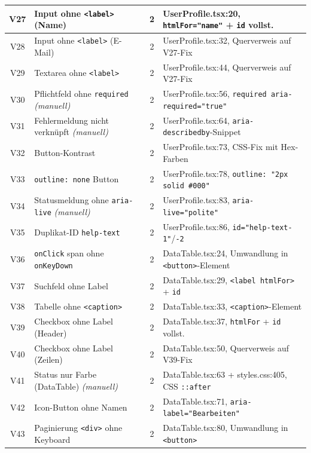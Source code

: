 \begin{longtable}{|c|p{5.2cm}|c|p{5.8cm}|}
\hline
V27 & Input ohne \texttt{<label>} (Name)           & 2 & UserProfile.tsx:20, \texttt{htmlFor="name"} + \texttt{id} vollst. \\
\hline
V28 & Input ohne \texttt{<label>} (E-Mail)         & 2 & UserProfile.tsx:32, Querverweis auf V27-Fix \\
\hline
V29 & Textarea ohne \texttt{<label>}               & 2 & UserProfile.tsx:44, Querverweis auf V27-Fix \\
\hline
V30 & Pflichtfeld ohne \texttt{required} \textit{(manuell)} & 2 & UserProfile.tsx:56, \texttt{required aria-required="true"} \\
\hline
V31 & Fehlermeldung nicht verknüpft \textit{(manuell)} & 2 & UserProfile.tsx:64, \texttt{aria-describedby}-Snippet \\
\hline
V32 & Button-Kontrast                              & 2 & UserProfile.tsx:73, \ac{CSS}-Fix mit Hex-Farben \\
\hline
V33 & \texttt{outline: none} Button                & 2 & UserProfile.tsx:78, \texttt{outline: "2px solid \#000"} \\
\hline
V34 & Statusmeldung ohne \texttt{aria-live} \textit{(manuell)} & 2 & UserProfile.tsx:83, \texttt{aria-live="polite"} \\
\hline
V35 & Duplikat-ID \texttt{help-text}               & 2 & UserProfile.tsx:86, \texttt{id="help-text-1"}/\texttt{-2} \\
\hline
V36 & \texttt{onClick} span ohne \texttt{onKeyDown}& 2 & DataTable.tsx:24, Umwandlung in \texttt{<button>}-Element \\
\hline
V37 & Suchfeld ohne Label                          & 2 & DataTable.tsx:29, \texttt{<label htmlFor>} + \texttt{id} \\
\hline
V38 & Tabelle ohne \texttt{<caption>}              & 2 & DataTable.tsx:33, \texttt{<caption>}-Element \\
\hline
V39 & Checkbox ohne Label (Header)                 & 2 & DataTable.tsx:37, \texttt{htmlFor} + \texttt{id} vollst. \\
\hline
V40 & Checkbox ohne Label (Zeilen)                 & 2 & DataTable.tsx:50, Querverweis auf V39-Fix \\
\hline
V41 & Status nur Farbe (DataTable) \textit{(manuell)} & 2 & DataTable.tsx:63 + styles.css:405, \ac{CSS} \texttt{::after} \\
\hline
V42 & Icon-Button ohne Namen                       & 2 & DataTable.tsx:71, \texttt{aria-label="Bearbeiten"} \\
\hline
V43 & Paginierung \texttt{<div>} ohne Keyboard     & 2 & DataTable.tsx:80, Umwandlung in \texttt{<button>} \\

\end{longtable}
